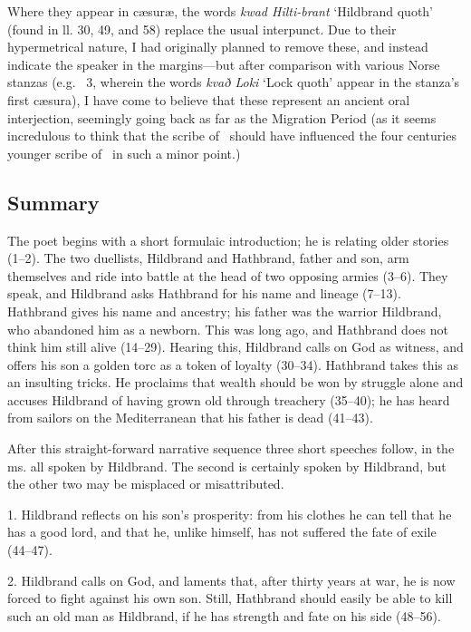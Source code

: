 Where they appear in cæsuræ, the words \emph{kwad Hilti-brant} ‘Hildbrand quoth’ (found in ll. 30, 49, and 58) replace the usual interpunct. Due to their hypermetrical nature, I had originally planned to remove these, and instead indicate the speaker in the margins—but after comparison with various Norse stanzas (e.g. \Reginsmal\ 3, wherein the words \emph{kvað Loki} ‘Lock quoth’ appear in the stanza’s first cæsura), I have come to believe that these represent an ancient oral interjection, seemingly going back as far as the Migration Period (as it seems incredulous to think that the scribe of \HildMS\ should have influenced the four centuries younger scribe of \Regius\ in such a minor point.)

\sectionline

\subsection{Summary}

The poet begins with a short formulaic introduction; he is relating older stories (1–2).  The two duellists, Hildbrand and Hathbrand, father and son, arm themselves and ride into battle at the head of two opposing armies (3–6). They speak, and Hildbrand asks Hathbrand for his name and lineage (7–13). Hathbrand gives his name and ancestry; his father was the warrior Hildbrand, who abandoned him as a newborn. This was long ago, and Hathbrand does not think him still alive (14–29). Hearing this, Hildbrand calls on God as witness, and offers his son a golden torc as a token of loyalty (30–34). Hathbrand takes this as an insulting tricks. He proclaims that wealth should be won by struggle alone and accuses Hildbrand of having grown old through treachery (35–40); he has heard from sailors on the Mediterranean that his father is dead (41–43).

After this straight-forward narrative sequence three short speeches follow, in the ms. all spoken by Hildbrand. The second is certainly spoken by Hildbrand, but the other two may be misplaced or misattributed.

1. Hildbrand reflects on his son’s prosperity: from his clothes he can tell that he has a good lord, and that he, unlike himself, has not suffered the fate of exile (44–47).

2. Hildbrand calls on God, and laments that, after thirty years at war, he is now forced to fight against his own son. Still, Hathbrand should easily be able to kill such an old man as Hildbrand, if he has strength and fate on his side (48–56).

